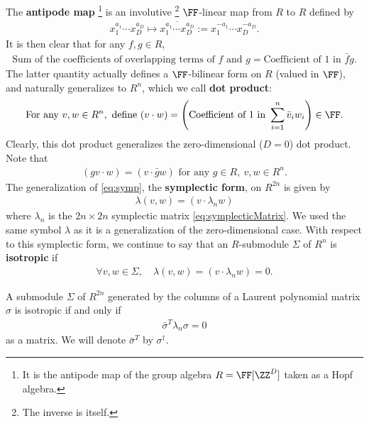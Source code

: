 The {\bf antipode map}%
\footnote{
It is the antipode map of the group algebra $R = \FF[\ZZ^D]$
taken as a Hopf algebra.
}
is an involutive%
\footnote{
The inverse is itself.
}
$\FF$-linear map from $R$ to $R$
defined by
\begin{align}
  x_1^{a_1} \cdots x_D^{a_D} \mapsto \overline{x_1^{a_1} \cdots x_D^{a_D}} := x_1^{-a_1} \cdots x_D^{-a_D} .
\end{align}
It is then clear that for any $f, g \in R$,
\begin{align}
 \text{Sum of the coefficients of overlapping terms of $f$ and $g$} = \text{Coefficient of 1 in } \bar f g .
\end{align}
The latter quantity actually defines a $\FF$-bilinear form on $R$ (valued in $\FF$),
and naturally generalizes to $R^n$, which we call {\bf dot product}:
\begin{align}
\text{For any } v, w \in R^n, \text{ define } (v \cdot w) = 
\left(
\text{Coefficient of 1 in } \sum_{i=1}^n \bar v_i w_i  
\right)
\in \FF.
\end{align}
Clearly, this dot product generalizes the zero-dimensional ($D=0$) dot product.
Note that
\begin{align}
 (g v \cdot w ) = ( v \cdot \bar g w) \text{ for any } g \in R, ~v,w \in R^n .
 \label{eq:DotProduct2}
\end{align}
The generalization of \eqref{eq:symp}, the {\bf symplectic form}, on $R^{2n}$ is given by
\begin{align}
 \lambda(v,w) = (v \cdot \lambda_n w)
\end{align}
where $\lambda_n$ is the $2n \times 2n$ symplectic matrix \eqref{eq:symplecticMatrix}.
We used the same symbol $\lambda$ as it is a generalization of the zero-dimensional case.
With respect to this symplectic form,
we continue to say that an $R$-submodule $\Sigma$ of $R^n$ is {\bf isotropic} if
\begin{align}
 \forall v,w \in \Sigma, \quad \lambda( v,w) = (v \cdot \lambda_n w) = 0.
\end{align}
\begin{prop}
A submodule $\Sigma$ of $R^{2n}$ generated by the columns of a Laurent polynomial matrix $\sigma$
is isotropic if and only if
\begin{align}
 \bar \sigma^T \lambda_n \sigma = 0
\end{align}
as a matrix. We will denote $\bar \sigma^T$ by $\sigma^\dagger$.
\label{IsotropyCondition}
\end{prop}
